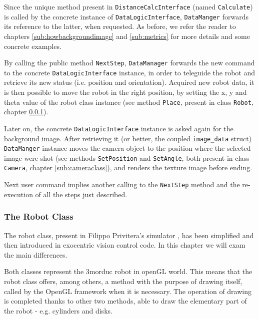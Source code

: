 %
Since the unique method present in \texttt{DistanceCalcInterface} (named \texttt{Calculate}) is called by the
concrete instance of \texttt{DataLogicInterface}, \newline \texttt{DataManger} forwards its reference to the latter,
when requested. As before, we refer the reader to chapters \ref{sub:howbackgroundimage} and \ref{sub:metrics} for
more details and some concrete examples.
%

%
By calling the public method \texttt{NextStep}, \texttt{DataManager} forwards the new command to the concrete
\texttt{DataLogicInterface} instance, in order to teleguide the robot and retrieve its new status
(i.e. position and orientation). Acquired new robot data, it is then possible to move the robot in the
right position, by setting the x, y and theta value of the robot class instance (see method \texttt{Place},
present in class \texttt{Robot}, chapter \ref{sub:robotclass}).
%

%
Later on, the concrete \texttt{DataLogicInterface} instance is asked again for the background image. After
retrieving it (or better, the coupled \texttt{image\_data} struct) \texttt{DataManger} instance moves the camera
object to the position where the selected image were shot (see methods \texttt{SetPosition} and \texttt{SetAngle},
both present in class \texttt{Camera}, chapter \ref{sub:cameraclass}), and renders the texture image before ending.
%

%
Next user command implies another calling to the \texttt{NextStep} method and the re-execution of all the steps just
described.




\subsubsection{The Robot Class}
\label{sub:robotclass}

The robot class, present in Filippo Privitera's simulator 
\cite{privitera}, has been simplified and then introduced in
exocentric vision control code. In this chapter we will 
exam the main differences.
%

%
Both classes represent the 3morduc robot in openGL world. 
This means that the robot class offers, among others, a
method with the purpose of drawing itself, called by the 
OpenGL framework when it is necessary. The operation of 
drawing is completed thanks to other two methods, able 
to draw the elementary part of the robot - e.g. cylinders and disks.
%

